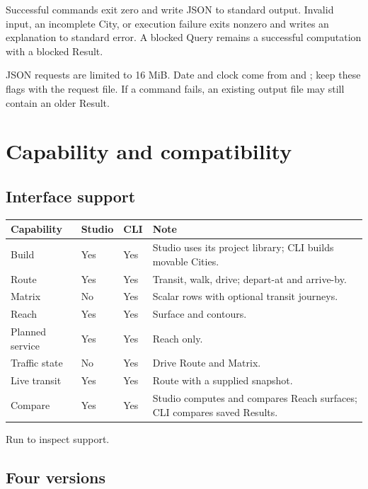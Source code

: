\documentclass[10pt,letterpaper]{article}
\begin{document}
Successful commands exit zero and write JSON to standard output. Invalid input, an incomplete City, or execution failure exits nonzero and writes an explanation to standard error. A blocked Query remains a successful computation with a blocked Result.

JSON requests are limited to 16 MiB. Date and clock come from  and ; keep these flags with the request file. If a command fails, an existing output file may still contain an older Result.

\newpage
\section{Capability and compatibility}

\subsection{Interface support}

\begin{center}
\begin{tabularx}{\linewidth}{P{1.55in} Z Z Y}
\toprule
\textbf{Capability} & \textbf{Studio} & \textbf{CLI} & \textbf{Note} \\
\midrule
Build & Yes & Yes & Studio uses its project library; CLI builds movable Cities. \\
Route & Yes & Yes & Transit, walk, drive; depart-at and arrive-by. \\
Matrix & No & Yes & Scalar rows with optional transit journeys. \\
Reach & Yes & Yes & Surface and contours. \\
Planned service & Yes & Yes & Reach only. \\
Traffic state & No & Yes & Drive Route and Matrix. \\
Live transit & Yes & Yes & Route with a supplied snapshot. \\
Compare & Yes & Yes & Studio computes and compares Reach surfaces; CLI compares saved Results. \\
\bottomrule
\end{tabularx}
\end{center}

Run  to inspect support.

\subsection{Four versions}
\end{document}
